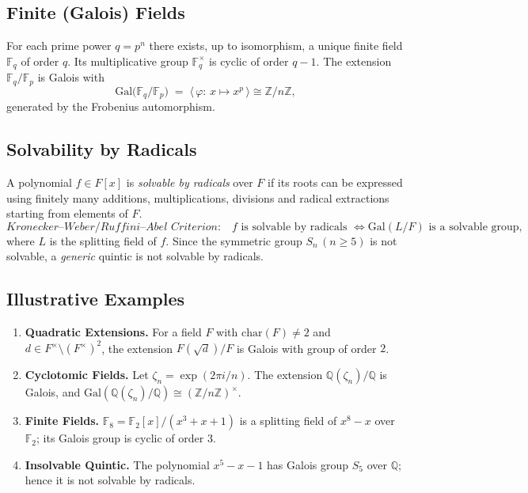 \subsection{Finite (Galois) Fields}

For each prime power \(q=p^{n}\) there exists, up to isomorphism, a unique finite field \(\mathbb{F}_{q}\) of order \(q\).  
Its multiplicative group \(\mathbb{F}_{q}^{\times}\) is cyclic of order \(q-1\).  
The extension \(\mathbb{F}_{q}/\mathbb{F}_{p}\) is Galois with
\[
\mathrm{Gal}\bigl(\mathbb{F}_{q}/\mathbb{F}_{p}\bigr)
\;=\;
\langle\,\varphi:\,x\mapsto x^{p}\,\rangle
\cong
\mathbb{Z}/n\mathbb{Z},
\]
generated by the Frobenius automorphism.

\subsection{Solvability by Radicals}

A polynomial \(f\in F[x]\) is \emph{solvable by radicals} over \(F\) if its roots can be expressed using finitely many additions, multiplications, divisions and radical extractions starting from elements of \(F\).  
\[
\textit{Kronecker–Weber/Ruffini–Abel Criterion:}\quad
f \text{ is solvable by radicals }
\Longleftrightarrow
\mathrm{Gal}(L/F) \text{ is a solvable group},
\]
where \(L\) is the splitting field of \(f\).  
Since the symmetric group \(S_n\,(n\ge 5)\) is not solvable, a \emph{generic} quintic is not solvable by radicals.

\subsection{Illustrative Examples}

\begin{enumerate}
    \item \textbf{Quadratic Extensions.}  
          For a field \(F\) with \(\mathrm{char}(F)\neq 2\) and \(d\in F^{\times}\setminus (F^{\times})^{2}\), the extension \(F(\sqrt{d})/F\) is Galois with group of order \(2\).
    \item \textbf{Cyclotomic Fields.}  
          Let \(\zeta_n=\exp(2\pi i/n)\).  
          The extension \(\mathbb{Q}(\zeta_n)/\mathbb{Q}\) is Galois, and
          \(\mathrm{Gal}(\mathbb{Q}(\zeta_n)/\mathbb{Q}) \cong (\mathbb{Z}/n\mathbb{Z})^{\times}\).
    \item \textbf{Finite Fields.}  
          \(\mathbb{F}_{8} = \mathbb{F}_{2}[x]/(x^{3}+x+1)\) is a splitting field of \(x^{8}-x\) over \(\mathbb{F}_{2}\); its Galois group is cyclic of order \(3\).
    \item \textbf{Insolvable Quintic.}  
          The polynomial \(x^{5}-x-1\) has Galois group \(S_{5}\) over \(\mathbb{Q}\); hence it is not solvable by radicals.
\end{enumerate}
